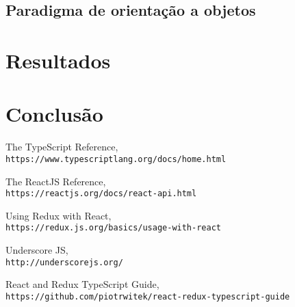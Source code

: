 \documentclass[rel_mlp]{iiufrgs}
\begin{document}
\section{Paradigma de orientação a objetos}

\chapter{Resultados}

\chapter{Conclusão}



\begin{thebibliography}{9}
The TypeScript Reference,
\\\texttt{https://www.typescriptlang.org/docs/home.html}

The ReactJS Reference,
\\\texttt{https://reactjs.org/docs/react-api.html}


Using Redux with React,
\\\texttt{https://redux.js.org/basics/usage-with-react}

Underscore JS,
\\\texttt{http://underscorejs.org/}

React and Redux TypeScript Guide,
\\\texttt{https://github.com/piotrwitek/react-redux-typescript-guide}

\end{thebibliography}
\end{document}

